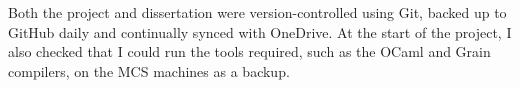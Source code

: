 
Both the project and dissertation were version-controlled using Git, backed up to GitHub daily and continually synced with OneDrive. %
At the start of the project, I also checked that I could run the tools required, such as the OCaml and Grain compilers, on the MCS machines as a backup. 





